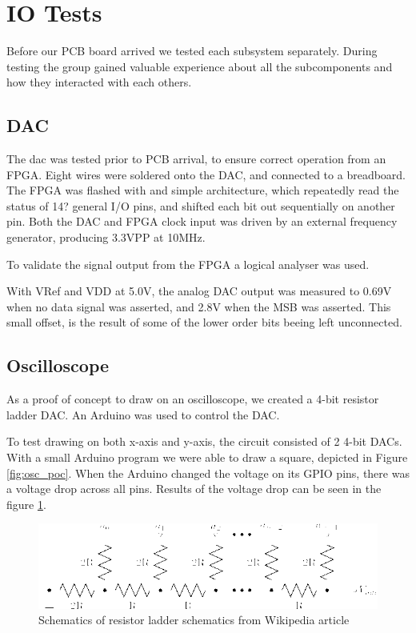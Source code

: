 \section{IO Tests}
Before our PCB board arrived we tested each subsystem separately.
During testing the group gained valuable experience about all the subcomponents and how they interacted with each others.

\subsection{DAC}
The dac was tested prior to PCB arrival, to ensure correct operation from an FPGA.
Eight wires were soldered onto the DAC, and connected to a breadboard.
The FPGA was flashed with and simple architecture, which repeatedly read the status of 14? general I/O pins, and shifted each bit out sequentially on another pin.
Both the DAC and FPGA clock input was driven by an external frequency generator, producing 3.3VPP at 10MHz.

To validate the signal output from the FPGA a logical analyser was used.

With VRef and VDD at 5.0V, the analog DAC output was measured to 0.69V when no data signal was asserted, and 2.8V when the MSB was asserted. This small offset, is the result of some of the lower order bits beeing left unconnected.

\subsection{Oscilloscope}
As a proof of concept to draw on an oscilloscope, we created a 4-bit resistor ladder DAC.
An Arduino was used to control the DAC.

To test drawing on both x-axis and y-axis, the circuit consisted of 2 4-bit DACs.
With a small Arduino program we were able to draw a square, depicted in Figure \ref{fig:osc_poc}.
When the Arduino changed the voltage on its GPIO pins, there was a voltage drop across all pins.
Results of the voltage drop can be seen in the figure \ref{fig:r2r-ladder}.


\begin{figure}[h]
\includegraphics[width=\columnwidth]{images/r2r-ladder}
\centering
\caption{Schematics of resistor ladder schematics from Wikipedia article \cite{r2r-ladder-schematics}}
\label{fig:r2r-ladder}
\end{figure}

